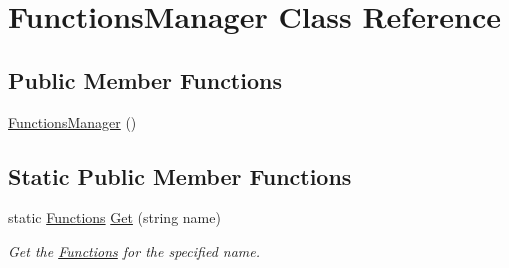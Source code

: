 \hypertarget{class_functions_manager}{}\section{Functions\+Manager Class Reference}
\label{class_functions_manager}
\subsection*{Public Member Functions}
\begin{DoxyCompactItemize}
\item 
\hyperlink{class_functions_manager_ab3b4cff9b6a9c0acdc1b38faa2e6702c}{Functions\+Manager} ()
\end{DoxyCompactItemize}
\subsection*{Static Public Member Functions}
\begin{DoxyCompactItemize}
\item 
static \hyperlink{class_functions}{Functions} \hyperlink{class_functions_manager_a7922710417bbd3150afb6d3ee6783d70}{Get} (string name)
\begin{DoxyCompactList}\small\item\em Get the \hyperlink{class_functions}{Functions} for the specified name. \end{DoxyCompactList}\end{DoxyCompactItemize}
